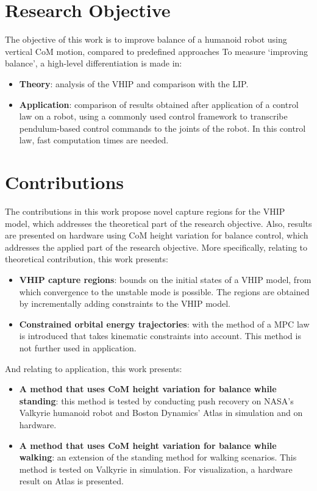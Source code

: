 \section{Research Objective}
The objective of this work is to improve balance of a humanoid robot using vertical \ac{CoM} motion, compared to predefined approaches To measure `improving balance', a high-level differentiation is made in:
\begin{itemize}
	\item \textbf{Theory}: analysis of the \ac{VHIP} and comparison with the \ac{LIP}.
	\item \textbf{Application}: comparison of results obtained after application of a control law on a robot, using a commonly used control framework to transcribe pendulum-based control commands to the joints of the robot. In this control law, fast computation times are needed.
\end{itemize}

\section{Contributions}
The contributions in this work propose novel capture regions for the \ac{VHIP} model, which addresses the theoretical part of the research objective. Also, results are presented on hardware using \ac{CoM} height variation for balance control, which addresses the applied part of the research objective. More specifically, relating to theoretical contribution, this work presents:
\begin{itemize}
	\item \textbf{\ac{VHIP} capture regions}: bounds on the initial states of a \ac{VHIP} model, from which convergence to the unstable mode is possible. The regions are obtained by incrementally adding constraints to the \ac{VHIP} model. 
      \item \textbf{Constrained orbital energy trajectories}: with the method of \cite{koolen2016balance} a \ac{MPC} law is introduced that takes kinematic constraints into account. This method is not further used in application.
\end{itemize}

And relating to application, this work presents:
\begin{itemize}
	\item \textbf{A method that uses \ac{CoM} height variation for balance while standing}: this method is tested by conducting push recovery on NASA's Valkyrie humanoid robot and Boston Dynamics' Atlas in simulation and on hardware.
	\item \textbf{A method that uses \ac{CoM} height variation for balance while walking}: an extension of the standing method for walking scenarios. This method is tested on Valkyrie in simulation. For visualization, a hardware result on Atlas is presented.
\end{itemize}
